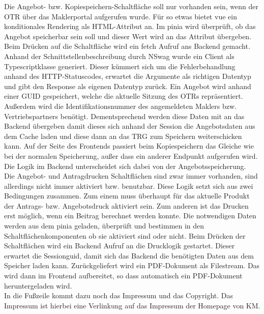 Die Angebot- bzw. Kopiespeichern-Schaltfläche soll nur vorhanden sein, wenn der \ac{OTR} über das Maklerportal aufgerufen wurde. Für so etwas bietet \gls{vue} ein konditionales Rendering als \gls{HTML}-Attribut an. Im \gls{pinia} wird überprüft, ob das Angebot speicherbar sein soll und dieser Wert wird an das Attribut übergeben. Beim Drücken auf die Schaltfläche wird ein \gls{fetch} Aufruf ans Backend gemacht. Anhand der Schnittstellenbeschreibung durch \gls{NSwag} wurde ein Client als Typescriptklasse generiert. Dieser kümmert sich um die Fehlerbehandlung anhand des \gls{HTTP}-Statuscodes, erwartet die Argumente als richtigen Datentyp und gibt den Response als eigenen Datentyp zurück. Ein Angebot wird anhand einer \ac{GUID} gespeichert, welche die aktuelle Sitzung des \ac{OTR}s repräsentiert. Außerdem wird die Identifikationsnummer des angemeldeten Maklers bzw. Vertriebspartners benötigt. Dementsprechend werden diese Daten mit an das Backend übergeben damit dieses sich anhand der Session die Angebotsdaten aus dem Cache laden und diese dann an das \ac{TRG} zum Speichern weiterschicken kann. Auf der Seite des Frontends passiert beim Kopiespeichern das Gleiche wie bei der normalen Speicherung, außer dass ein anderer Endpunkt aufgerufen wird. Die Logik im Backend unterscheidet sich dabei von der Angebotsspeicherung.\\

Die Angebot- und Antragdrucken Schaltflächen sind zwar immer vorhanden, sind allerdings nicht immer aktiviert bzw. benutzbar. Diese Logik setzt sich aus zwei Bedingungen zusammen. Zum einem muss überhaupt für das aktuelle Produkt der Antrags- bzw. Angebotsdruck aktiviert sein. Zum anderen ist das Drucken erst möglich, wenn ein Beitrag berechnet werden konnte. Die notwendigen Daten werden aus dem \gls{pinia} geladen, überprüft und bestimmen in den Schaltflächenkomponenten ob sie aktiviert sind oder nicht. Beim Drücken der Schaltflächen wird ein Backend Aufruf an die Drucklogik gestartet. Dieser erwartet die Sessionguid, damit sich das Backend die benötigten Daten aus dem Speicher laden kann. Zurückgeliefert wird ein PDF-Dokument als Filestream. Das wird dann im Frontend aufbereitet, so dass automatisch ein PDF-Dokument heruntergeladen wird.\\
In die Fußzeile kommt dazu noch das Impressum und das Copyright. Das Impressum ist hierbei eine Verlinkung auf das Impressum der Homepage von \ac{KM}.

